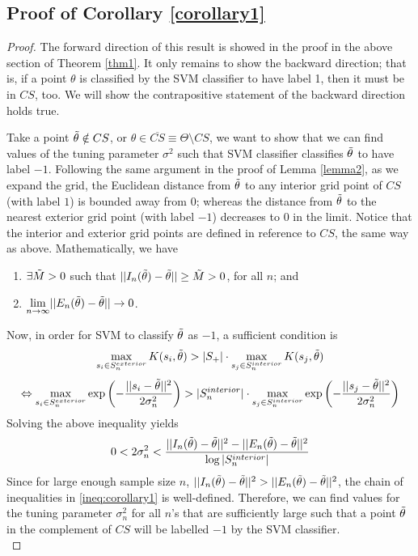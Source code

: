 \documentclass[12pt]{article}
\theoremstyle{definition}
\begin{document}
\begin{appendices}
\subsection{Proof of Corollary \ref{corollary1}}
\begin{proof}
The forward direction of this result is showed in the proof in the above section of Theorem \ref{thm1}. It only remains to show the backward direction; that is, if a point $\theta$ is classified by the SVM classifier to have label 1, then it must be in $CS$, too. We will show the contrapositive statement of the backward direction holds true. 

Take a point $\Tilde{\theta}\notin CS$, or $\theta\in\overline{CS}\equiv\Theta\setminus CS$, we want to show that we can find values of the tuning parameter $\sigma^2$ such that SVM classifier classifies $\Tilde{\theta}$ to have label $-1$. Following the same argument in the proof of Lemma \ref{lemma2}, as we expand the grid, the Euclidean distance from $\Tilde{\theta}$ to any interior grid point of $CS$ (with label $1$) is bounded away from 0; whereas the distance from $\Tilde{\theta}$ to the nearest exterior grid point (with label $-1$) decreases to $0$ in the limit. Notice that the interior and exterior grid points are defined in reference to $CS$, the same way as above. Mathematically, we have
\begin{enumerate}
    \item $\exists \Tilde{M}>0$ such that $||I_n(\Tilde{\theta})-\Tilde{\theta}||\geq \Tilde{M}>0$, for all $n$; and 
    \item $\underset{n\to\infty}{\lim}||E_n(\Tilde{\theta})-\Tilde{\theta}||\to 0$.
\end{enumerate}
Now, in order for SVM to classify $\Tilde{\theta}$ as $-1$, a sufficient condition is 
$$\max_{s_i\in S_n^{exterior}} K(s_i,\Tilde{\theta})>|S_+|\cdot \max_{s_j\in S_n^{interior}} K(s_j,\Tilde{\theta})$$
$$\Leftrightarrow \max_{s_i\in S_n^{exterior}} \exp\left(-\frac{||s_i-\Tilde{\theta}||^2}{2\sigma_n^2}\right)>|S_n^{interior}|\cdot \max_{s_j\in S_n^{interior}} \exp\left(-\frac{||s_j-\Tilde{\theta}||^2}{2\sigma_n^2}\right)$$
Solving the above inequality yields
\begin{equation}\label{ineq:corollary1}
0<2\sigma_n^2<\frac{||I_n(\Tilde{\theta})-\Tilde{\theta}||^2-||E_n(\Tilde{\theta})-\Tilde{\theta}||^2}{\log|S_n^{interior}|}
\end{equation}
Since for large enough sample size $n$, $||I_n(\Tilde{\theta})-\Tilde{\theta}||^2>||E_n(\Tilde{\theta})-\Tilde{\theta}||^2$, the chain of inequalities in \ref{ineq:corollary1} is well-defined. Therefore, we can find values for the tuning parameter $\sigma_n^2$ for all $n$'s that are sufficiently large such that a point $\Tilde{\theta}$ in the complement of $CS$ will be labelled $-1$ by the SVM classifier. \\

\end{proof}
\end{appendices}
\end{document}
